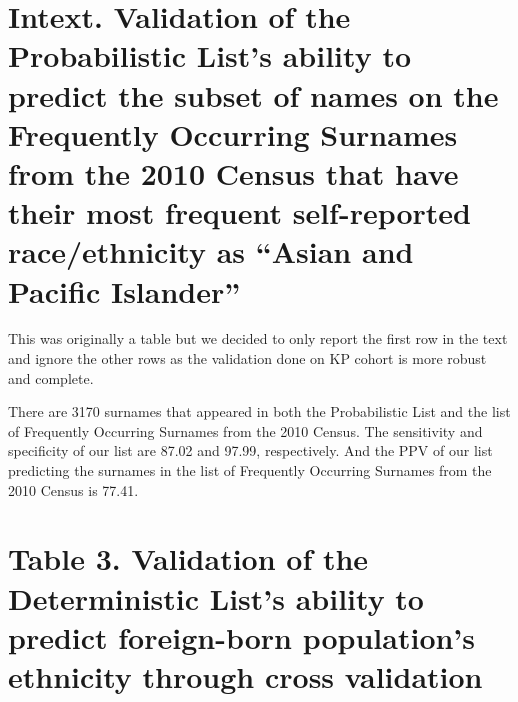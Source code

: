 \documentclass[
  landscape]{article}
\begin{document}
\hypertarget{intext.-validation-of-the-probabilistic-lists-ability-to-predict-the-subset-of-names-on-the-frequently-occurring-surnames-from-the-2010-census-that-have-their-most-frequent-self-reported-raceethnicity-as-asian-and-pacific-islander}{%
\section{Intext. Validation of the Probabilistic List's ability to
predict the subset of names on the Frequently Occurring Surnames from
the 2010 Census that have their most frequent self-reported
race/ethnicity as ``Asian and Pacific
Islander''}\label{intext.-validation-of-the-probabilistic-lists-ability-to-predict-the-subset-of-names-on-the-frequently-occurring-surnames-from-the-2010-census-that-have-their-most-frequent-self-reported-raceethnicity-as-asian-and-pacific-islander}}

This was originally a table but we decided to only report the first row
in the text and ignore the other rows as the validation done on KP
cohort is more robust and complete.

There are 3170 surnames that appeared in both the Probabilistic List and
the list of Frequently Occurring Surnames from the 2010 Census. The
sensitivity and specificity of our list are 87.02 and 97.99,
respectively. And the PPV of our list predicting the surnames in the
list of Frequently Occurring Surnames from the 2010 Census is 77.41.

\newpage

\hypertarget{table-3.-validation-of-the-deterministic-lists-ability-to-predict-foreign-born-populations-ethnicity-through-cross-validation}{%
\section{Table 3. Validation of the Deterministic List's ability to
predict foreign-born population's ethnicity through cross
validation}\label{table-3.-validation-of-the-deterministic-lists-ability-to-predict-foreign-born-populations-ethnicity-through-cross-validation}}
\end{document}
